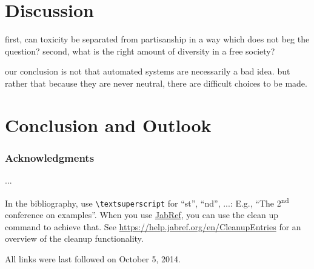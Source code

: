 \documentclass[runningheads,a4paper]{llncs}
\begin{document}
\section{Discussion}
first, can toxicity be separated from partisanship in a way which does not beg the question?
second, what is the right amount of diversity in a free society?

our conclusion is not that automated systems are necessarily a bad idea. but rather that because they are never neutral, there are difficult choices to be made.


\section{Conclusion and Outlook}

\subsubsection*{Acknowledgments}
...

In the bibliography, use \texttt{\textbackslash textsuperscript} for ``st'', ``nd'', ...:
E.g., \enquote{The 2\textsuperscript{nd} conference on examples}.
When you use \href{https://www.jabref.org}{JabRef}, you can use the clean up command to achieve that.
See \url{https://help.jabref.org/en/CleanupEntries} for an overview of the cleanup functionality.




All links were last followed on October 5, 2014.
\end{document}
